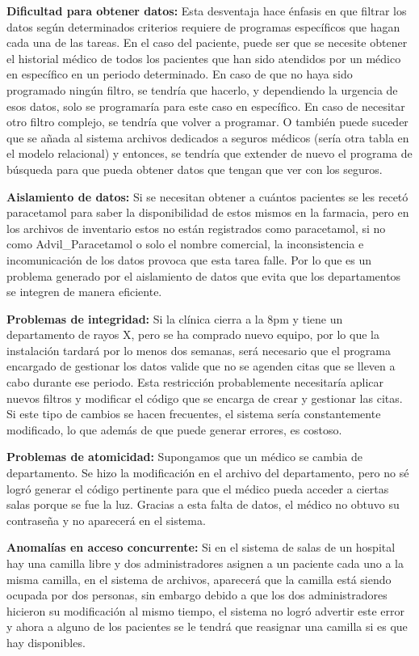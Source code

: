 \documentclass[12pt]{report}
\begin{document}
\begin{enumerate}[label=\textbf{\arabic*.}, leftmargin=*]
\begin{enumerate}[label=\textbf{\alph*.}, leftmargin=*, itemsep=1.0em]
    \textbf{Dificultad para obtener datos:}
    Esta desventaja hace énfasis en que filtrar los datos según determinados criterios requiere de programas específicos que hagan cada una de las tareas.
    En el caso del paciente, puede ser que se necesite obtener el historial médico de todos los pacientes que han sido atendidos por un médico en específico en un periodo determinado. En caso de que no haya sido programado ningún filtro, se tendría que hacerlo, y dependiendo la urgencia de esos datos, solo se programaría para este caso en específico. En caso de necesitar otro filtro complejo, se tendría que volver a programar. O también puede suceder que se añada al sistema archivos dedicados a seguros médicos (sería otra tabla en el modelo relacional) y entonces, se tendría que extender de nuevo el programa de búsqueda para que pueda obtener datos que tengan que ver con los seguros.

    \textbf{Aislamiento de datos:}
    Si se necesitan obtener a cuántos pacientes se les recetó paracetamol para saber la disponibilidad de estos mismos en la farmacia, pero en los archivos de inventario estos no están registrados como paracetamol, si no como Advil\_Paracetamol o solo el nombre comercial, la inconsistencia e incomunicación de los datos provoca que esta tarea falle. Por lo que es un problema generado por el aislamiento de datos que evita que los departamentos se integren de manera eficiente.


    \textbf{Problemas de integridad:}
    Si la clínica cierra a la 8pm y tiene un departamento de rayos X, pero se ha comprado nuevo equipo, por lo que la instalación tardará por lo menos dos semanas, será necesario que el programa encargado de gestionar los datos valide que no se agenden citas que se lleven a cabo durante ese periodo.
    Esta restricción probablemente necesitaría aplicar nuevos filtros y modificar el código que se encarga de crear y gestionar las citas.
    Si este tipo de cambios se hacen frecuentes, el sistema sería constantemente modificado, lo que además de que puede generar errores, es costoso.

    \textbf{Problemas de atomicidad:}
    Supongamos que un médico se cambia de departamento. Se hizo la modificación en el archivo del departamento, pero no sé logró generar el código pertinente para que el médico pueda acceder a ciertas salas porque se fue la luz. Gracias a esta falta de datos, el médico no obtuvo su contraseña y no aparecerá en el sistema.

    \textbf{Anomalías en acceso concurrente:}
    Si en el sistema de salas de un hospital hay una camilla libre y dos administradores asignen a un paciente cada uno a la misma camilla, en el sistema de archivos, aparecerá que la camilla está siendo ocupada por dos personas, sin embargo debido a que los dos administradores hicieron su modificación al mismo tiempo, el sistema no logró advertir este error y ahora a alguno de los pacientes se le tendrá que reasignar una camilla si es que hay disponibles.


\end{enumerate}
\end{enumerate}
\end{document}
